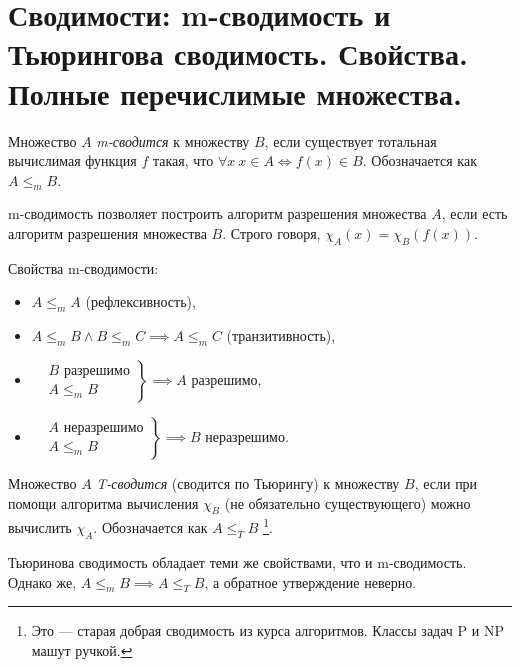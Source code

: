 \documentclass{article}
\begin{document}
    \section{Сводимости: m-сводимость и Тьюрингова сводимость. Свойства. Полные перечислимые множества.}

    \begin{definition}
        Множество $A$ \textit{m-сводится} к множеству $B$, если существует тотальная вычислимая
        функция $f$ такая, что $\forall x \ x \in A \iff f(x) \in B$. Обозначается как $A
        \leqslant_m B$.
    \end{definition}

    m-сводимость позволяет построить алгоритм разрешения множества $A$, если есть алгоритм
    разрешения множества $B$. Строго говоря, $\chi_A(x) = \chi_B(f(x))$.

    Свойства m-сводимости:
    \begin{itemize}
        \item $A \leqslant_m A$ (рефлексивность),
        \item $A \leqslant_m B \wedge B \leqslant_m C \implies A \leqslant_m C$ (транзитивность),
        \item
        $
        \left.\begin{aligned}
                &B \text{ разрешимо}\\
                &A \leqslant_m B
        \end{aligned}\right\}
        \implies A \text{ разрешимо},
        $
        \item
        $
        \left.\begin{aligned}
                &A \text{ неразрешимо}\\
                &A \leqslant_m B
        \end{aligned}\right\}
        \implies B \text{ неразрешимо}.
        $
    \end{itemize}

    \begin{definition}
        Множество $A$ \textit{T-сводится} (сводится по Тьюрингу) к множеству $B$, если при помощи
        алгоритма вычисления $\chi_B$ (не обязательно существующего) можно вычислить $\chi_A$.
        Обозначается как $A \leqslant_T B$ \footnote{Это --- старая добрая сводимость из курса
        алгоритмов. Классы задач P и NP машут ручкой.}.
    \end{definition}

    Тьюринова сводимость обладает теми же свойствами, что и m-сводимость. Однако же, $A \leqslant_m
    B \implies A \leqslant_T B$, а обратное утверждение неверно.
\end{document}
